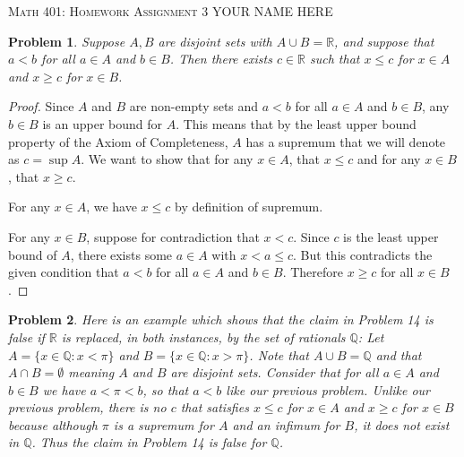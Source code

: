 \documentclass[12pt]{article}
\newtheorem{problem}{Problem}
\newcommand{\QQ}{\ensuremath{\mathbb Q}}
\newcommand{\RR}{\ensuremath{\mathbb R}}
\begin{document}
\small
\noindent \textsc{Math 401: Homework Assignment 3} \hfill YOUR NAME HERE

\normalsize
\bigskip

\setcounter{problem}{13}


\begin{problem} %
Suppose $A,B$ are disjoint sets with $A\cup B = \RR$, and suppose that $a<b$ for all $a\in A$ and $b\in B$.  Then there exists $c\in\RR$ such that $x\le c$ for $x\in A$ and $x\ge c$ for $x\in B$. 
\end{problem}


\begin{proof}
 Since $A$ and $B$ are non-empty sets and $a < b$ for all $a \in A$ and $b \in B$, any $b \in B$ is an upper bound for $A$. This means that by the least upper bound property of the Axiom of Completeness, $A$ has a supremum that we will denote as $c = \sup{A}$. We want to show that for any $x \in A$, that $x \leq c$ and for any $x \in B$, that $x \geq c$.

For any $x \in A$, we have $x \leq c$ by definition of supremum.

For any $x \in B$, suppose for contradiction that $x < c$. Since $c$ is the least upper bound of $A$, there exists some $a \in A$ with $x < a \leq c$. But this contradicts the given condition that $a < b$ for all $a \in A$ and $b \in B$. Therefore $x \geq c$ for all $x \in B$.
 \end{proof}


\begin{problem} %
Here is an example which shows that the claim in Problem 14 is false if $\RR$ is replaced, in both instances, by the set of rationals $\QQ$:
\newline
\newline
Let $A = \{x \in \QQ : x< \pi\}$ and $B = \{x \in \QQ : x > \pi\}$.
\newline
\newline
Note that $A \cup B = \QQ $ and that $A \cap B = \emptyset$ meaning $A$ and $B$ are disjoint sets.
Consider that for all $a \in A$ and $b \in B$ we have $a < \pi < b$, so that $a < b$ like our previous problem. Unlike our previous problem, there is
no $c$ that satisfies $x \leq c$ for $x \in A$ and $ x \geq c$ for $x \in B$ because although $\pi$ is a supremum for $A$ and an infimum for $B$, it does not exist in $\QQ$. Thus the claim in Problem 14 is false for $\QQ$.
\end{problem}
\end{document}
